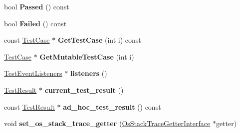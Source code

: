 \begin{DoxyCompactItemize}
\mbox{\label{classtesting_1_1internal_1_1_unit_test_impl_ae8e461369acfec902da382bc02297fe5}} 
bool {\bfseries Passed} () const
\item 
\mbox{\label{classtesting_1_1internal_1_1_unit_test_impl_a0c95d1b56b5f33057afc516db05ac313}} 
bool {\bfseries Failed} () const
\item 
\mbox{\label{classtesting_1_1internal_1_1_unit_test_impl_a6438e18ea4904d239a3db7b036a52229}} 
const \mbox{\hyperlink{classtesting_1_1_test_case}{Test\+Case}} $\ast$ {\bfseries Get\+Test\+Case} (int i) const
\item 
\mbox{\label{classtesting_1_1internal_1_1_unit_test_impl_a2ca71a08060037357fc7e1a406b89add}} 
\mbox{\hyperlink{classtesting_1_1_test_case}{Test\+Case}} $\ast$ {\bfseries Get\+Mutable\+Test\+Case} (int i)
\item 
\mbox{\label{classtesting_1_1internal_1_1_unit_test_impl_a67211f8475936f88d0e4d30f841c0da4}} 
\mbox{\hyperlink{classtesting_1_1_test_event_listeners}{Test\+Event\+Listeners}} $\ast$ {\bfseries listeners} ()
\item 
\mbox{\label{classtesting_1_1internal_1_1_unit_test_impl_aba3caef4ad23ce98be80250aeb0cc787}} 
\mbox{\hyperlink{classtesting_1_1_test_result}{Test\+Result}} $\ast$ {\bfseries current\+\_\+test\+\_\+result} ()
\item 
\mbox{\label{classtesting_1_1internal_1_1_unit_test_impl_a8be26dc90e0fac8f8be3552ffd98c69c}} 
const \mbox{\hyperlink{classtesting_1_1_test_result}{Test\+Result}} $\ast$ {\bfseries ad\+\_\+hoc\+\_\+test\+\_\+result} () const
\item 
\mbox{\label{classtesting_1_1internal_1_1_unit_test_impl_a3306f7d2b19bca54b841006e4a2e0260}} 
void {\bfseries set\+\_\+os\+\_\+stack\+\_\+trace\+\_\+getter} (\mbox{\hyperlink{classtesting_1_1internal_1_1_os_stack_trace_getter_interface}{Os\+Stack\+Trace\+Getter\+Interface}} $\ast$getter)

\end{DoxyCompactItemize}
